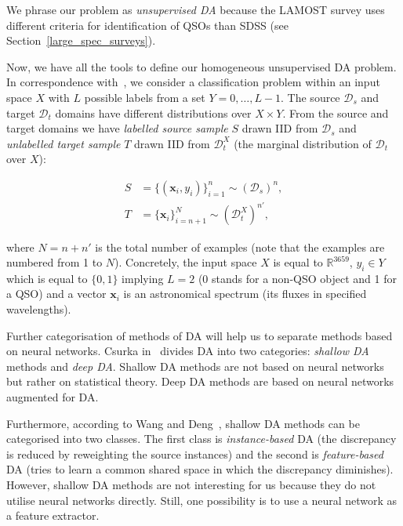 We phrase our problem as \textit{unsupervised DA}
because the LAMOST survey uses different criteria for identification of QSOs than SDSS
(see Section~\ref{large_spec_surveys}).

Now, we have all the tools to define our homogeneous unsupervised DA problem.
In correspondence with~\cite{ganin2016},
we consider a classification problem within an input space \(X\)
with \(L\) possible labels from a set \(Y = {0, \dots, L - 1}\).
The source \(\mathcal{D}_s\) and target \(\mathcal{D}_t\) domains
have different distributions over \(X \times Y\).
From the source and target domains
we have \textit{labelled source sample} \(S\) drawn IID from \(\mathcal{D}_s\)
and \textit{unlabelled target sample} \(T\) drawn IID from \(\mathcal{D}^X_t\) 
(the marginal distribution of \(\mathcal{D}_t\) over \(X\)):

\begin{align}
	S &= \{(\mathbf{x}_i, y_i)\}^n_{i = 1} \sim (\mathcal{D}_s)^n, \\
	T &= \{\mathbf{x}_i\}^N_{i = n + 1} \sim (\mathcal{D}^X_t)^{n'},
\end{align}

where \(N = n + n'\) is the total number of examples
(note that the examples are numbered from 1 to \(N\)).
Concretely, the input space \(X\) is equal to \(\mathbb{R}^{3659}\),
\(y_i \in Y\) which is equal to \(\{0, 1\}\) implying \(L = 2\)
(0 stands for a non-QSO object and 1 for a QSO)
and a vector \(\mathbf{x}_i\) is an astronomical spectrum
(its fluxes in specified wavelengths).

Further categorisation of methods of DA will help us to separate methods based on neural networks.
Csurka in~\cite{csurka2017} divides DA into two categories:
\textit{shallow DA} methods and \textit{deep DA}.
Shallow DA methods are not based on neural networks but rather on statistical theory.
Deep DA methods are based on neural networks augmented for DA.

Furthermore, according to Wang and Deng~\cite{wang2018},
shallow DA methods can be categorised into two classes.
The first class is \textit{instance-based} DA
(the discrepancy is reduced by reweighting the source instances)
and the second is \textit{feature-based} DA
(tries to learn a common shared space in which the discrepancy diminishes).
However, shallow DA methods are not interesting for us
because they do not utilise neural networks directly.
Still, one possibility is to use a neural network as a feature extractor.~\cite{csurka2017}

